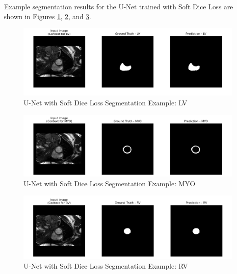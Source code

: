 \documentclass{article}
\begin{document}
Example segmentation results for the U-Net trained with Soft Dice Loss are shown in Figures \ref{fig:soft_dice_example_lv}, \ref{fig:soft_dice_example_myo}, and \ref{fig:soft_dice_example_rv}.
\begin{figure}[H]
  \centering
  \includegraphics[width=\linewidth]{../result/for_ppt/soft_dice_loss_LV.png}
  \caption{U-Net with Soft Dice Loss Segmentation Example: LV}
  \label{fig:soft_dice_example_lv}
\end{figure}
\begin{figure}[H]
  \centering
  \includegraphics[width=\linewidth]{../result/for_ppt/soft_dice_loss_MYO.png}
  \caption{U-Net with Soft Dice Loss Segmentation Example: MYO}
  \label{fig:soft_dice_example_myo}
\end{figure}
\begin{figure}[H]
  \centering
  \includegraphics[width=\linewidth]{../result/for_ppt/soft_dice_loss_RV.png}
  \caption{U-Net with Soft Dice Loss Segmentation Example: RV}
  \label{fig:soft_dice_example_rv}
\end{figure}
\end{document}
